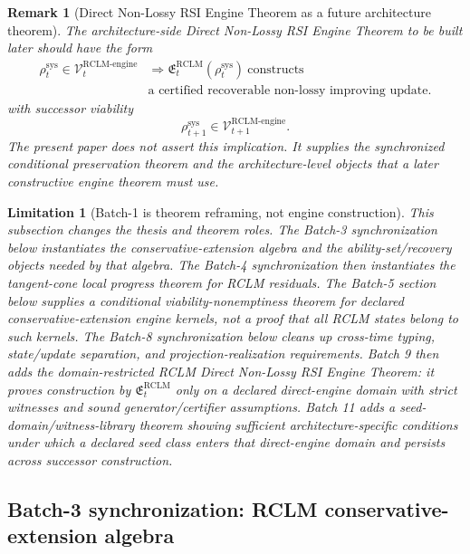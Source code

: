 \documentclass[11pt,a4paper]{article}
\newtheorem{remark}[theorem]{Remark}
\newtheorem{limitation}[theorem]{Limitation}
\newcommand{\Vcal}{\mathcal V}
\newcommand{\RCLM}{\mathrm{RCLM}}
\newcommand{\sys}{\mathrm{sys}}
\newcommand{\engine}{\mathrm{engine}}
\begin{document}
\begin{remark}[Direct Non-Lossy RSI Engine Theorem as a future architecture theorem]
\label{rem:rclm-direct-engine-theorem-target}
The architecture-side Direct Non-Lossy RSI Engine Theorem to be built later should have the form
\[
\begin{aligned}
\rho_t^{\sys}\in\Vcal_t^{\RCLM\text{-}\engine}
&\Longrightarrow
\mathfrak E_t^{\RCLM}(\rho_t^{\sys})\ \text{constructs}\\
&\text{a certified recoverable non-lossy improving update.}
\end{aligned}
\]
with successor viability
\[
\rho_{t+1}^{\sys}\in\Vcal_{t+1}^{\RCLM\text{-}\engine}.
\]
The present paper does not assert this implication.  It supplies the synchronized conditional preservation theorem and the architecture-level objects that a later constructive engine theorem must use.
\end{remark}

\begin{limitation}[Batch-1 is theorem reframing, not engine construction]
This subsection changes the thesis and theorem roles.  The Batch-3 synchronization below instantiates the conservative-extension algebra and the ability-set/recovery objects needed by that algebra.  The Batch-4 synchronization then instantiates the tangent-cone local progress theorem for RCLM residuals.  The Batch-5 section below supplies a conditional viability-nonemptiness theorem for declared conservative-extension engine kernels, not a proof that all RCLM states belong to such kernels. The Batch-8 synchronization below cleans up cross-time typing, state/update separation, and projection-realization requirements. Batch 9 then adds the domain-restricted RCLM Direct Non-Lossy RSI Engine Theorem: it proves construction by \(\mathfrak E_t^{\RCLM}\) only on a declared direct-engine domain with strict witnesses and sound generator/certifier assumptions. Batch 11 adds a seed-domain/witness-library theorem showing sufficient architecture-specific conditions under which a declared seed class enters that direct-engine domain and persists across successor construction.
\end{limitation}


\subsection{Batch-3 synchronization: RCLM conservative-extension algebra}
\label{subsec:batch3-rclm-conservative-extension-algebra}
\end{document}

